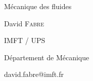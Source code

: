 

\begin{frame}

  \color{bleu}

  \begin{flushleft}
    
    \Large
   	\bf
    
    Mécanique des fluides 

  \end{flushleft}
  

  \begin{flushright}

    \rm

    \textrm{David} \textsc{Fabre}
    
    \vspace{3mm}
    
    IMFT / UPS
    
    Département de Mécanique
    
    david.fabre@imft.fr

  \end{flushright}




\end{frame}

